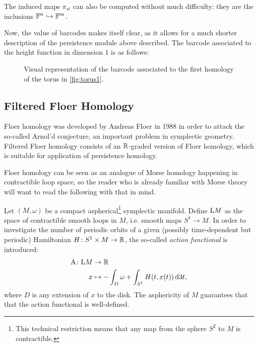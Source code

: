 The induced maps $\pi_{st}$ can also be computed without much difficulty: they are the inclusions $\mathbb{F}^n \hookrightarrow \mathbb{F}^m$.

Now, the value of barcodes makes itself clear, as it allows for a much shorter description of the persistence module above described. The barcode associated to the height function in dimension $1$ is as follows:
\begin{figure}[H]
\centering
{}
\caption{Visual representation of the barcode associated to the first homology of the torus in \ref{fig:torus1}.}\label{fig:bctorus}
\end{figure}

\subsection{Filtered Floer Homology}
\label{sec:ph}

Floer homology was developed by Andreas Floer in 1988 in order to attack the so-called Arnol'd conjecture, an important problem in symplectic geometry. Filtered Floer homology consists of an $\mathbb{R}$-graded version of Floer homology, which is suitable for application of persistence homology.

Floer homology can be seen as an analogue of Morse homology happening in contractible loop space, so the reader who is already familiar with Morse theory will want to read the following with that in mind.

Let $(M,\omega)$ be a compact aspherical\footnote{This technical restriction means that any map from the sphere $S^2$ to $M$ is contractible.} symplectic manifold. Define $\mathrm{L} M$ as the space of contractible smooth loops in $M$, i.e. smooth maps $S^1 \to M$. In order to investigate the number of periodic orbits of a given (possibly time-dependent but periodic) Hamiltonian $H \colon S^1 \times M \to \mathbb{R}$, the so-called \emph{action functional} is introduced:
\begin{equation}
\begin{aligned}
\AA \colon \LL M &\to \R\\
x &\mapsto -\int_D \omega + \int_{S^1} H(t, x(t)) \dl3 t,
\end{aligned}
\end{equation}
where $D$ is any extension of $x$ to the disk. The asphericity of $M$ guarantees that that the action functional is well-defined.


